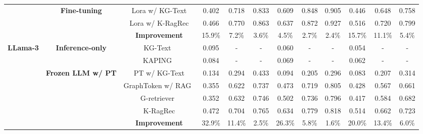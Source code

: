 \begin{table}[t]
{\begin{adjustbox}{}
\begin{tabular}{c|c|c|c|c|c|c|c|c|c|c|c}
    \cmidrule{2-12}
    &\multirow{3}{*}{\textbf{Fine-tuning}} &Lora w/ KG-Text&    0.402 & 0.718 & \colorbox{backblue!75}{0.833} &\colorbox{backblue!75}{0.609} &0.848   &0.905   &0.446   &0.648  &0.758 \\
     & & Lora w/ K-RagRec &  \colorbox{backred!50} {0.466} & \colorbox{backred!50} {0.770}  & \colorbox{backred!50} {0.863} & \colorbox{backred!50} {0.637}  & \colorbox{backred!50} {0.872} & \colorbox{backred!50} {0.927}  & \colorbox{backred!50} {0.516}   & \colorbox{backred!50} {0.720}   & \colorbox{backred!50} {0.799} \\
     \cmidrule{3-12}
    && \cellcolor{verylightgray} \textbf{Improvement} &  \cellcolor{verylightgray}15.9\%  & \cellcolor{verylightgray}7.2\% & \cellcolor{verylightgray}3.6\%  & \cellcolor{verylightgray}4.5\% &  \cellcolor{verylightgray}2.7\% &  \cellcolor{verylightgray}2.4\%  &  \cellcolor{verylightgray}15.7\%  & \cellcolor{verylightgray}11.1\%   &   \cellcolor{verylightgray}5.4\%    \\
   \midrule
    \multirow{10}{*}{\textbf{LLama-3}}&   \multirow{2}{*}{\textbf{Inference-only}} & KG-Text~\citep{wu2023retrieve}& 0.095  & - & -  & 0.060 &  - &  -  &  0.054  &  -  &  - \\
    & &KAPING~\citep{baek2023knowledge}& 0.084  & - & -  & 0.069 &  - &  -  & 0.062   &  -  &  - \\
    \cmidrule{2-12}
    &\multirow{5}{*}{\textbf{Frozen LLM w/ PT}} &PT w/ KG-Text& 0.134  & 0.294  & 0.433 &0.094  &0.205 &0.296   &0.083   &0.207   &0.314   \\
    & &GraphToken w/ RAG~\citep{perozzi2024let} & 0.355  & 0.622  & 0.737 & 0.473 &0.719 & 0.805  &0.428   &0.567   &0.661    \\
    & &G-retriever~\citep{he2024g} & 0.352  & 0.632  & 0.746 & 0.502 &0.736 & 0.796  &0.417   & 0.584  &0.682 \\
     & & K-RagRec & \colorbox{backblue!75}{0.472}  & \colorbox{backblue!75}{0.704}  & \colorbox{backblue!75}{0.765} &0.634  &\colorbox{backblue!75}{0.779} &\colorbox{backblue!75}{0.818}    & \colorbox{backblue!75}{0.514}  & \colorbox{backblue!75}{0.662}  & \colorbox{backblue!75}{0.723} \\
  \cmidrule{3-12}
    && \cellcolor{verylightgray} \textbf{Improvement} &  \cellcolor{verylightgray}32.9\%  & \cellcolor{verylightgray}11.4\% & \cellcolor{verylightgray}2.5\%  & \cellcolor{verylightgray}26.3\% &  \cellcolor{verylightgray}5.8\% &  \cellcolor{verylightgray}1.6\%  &  \cellcolor{verylightgray}20.0\%  & \cellcolor{verylightgray}13.4\%   &   \cellcolor{verylightgray}6.0\%     \\

\end{tabular}
\end{adjustbox}}
\end{table}
